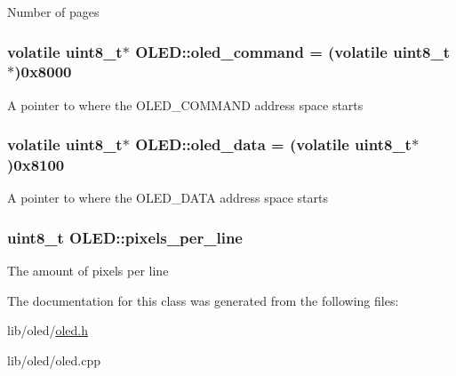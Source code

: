 Number of pages \hypertarget{class_o_l_e_d_af0a85ccd0274347b8c1ac77d298a14cf}{
\subsubsection[{oled\-\_\-command}]{\setlength{\rightskip}{0pt plus 5cm}volatile uint8\-\_\-t$\ast$ O\-L\-E\-D\-::oled\-\_\-command = (volatile uint8\-\_\-t$\ast$)0x8000\hspace{0.3cm}{\ttfamily [protected]}}}\label{class_o_l_e_d_af0a85ccd0274347b8c1ac77d298a14cf}
A pointer to where the O\-L\-E\-D\-\_\-\-C\-O\-M\-M\-A\-N\-D address space starts \hypertarget{class_o_l_e_d_a1bc54d49808f92ddfc354511b692df6f}{
\subsubsection[{oled\-\_\-data}]{\setlength{\rightskip}{0pt plus 5cm}volatile uint8\-\_\-t$\ast$ O\-L\-E\-D\-::oled\-\_\-data = (volatile uint8\-\_\-t$\ast$)0x8100\hspace{0.3cm}{\ttfamily [protected]}}}\label{class_o_l_e_d_a1bc54d49808f92ddfc354511b692df6f}
A pointer to where the O\-L\-E\-D\-\_\-\-D\-A\-T\-A address space starts \hypertarget{class_o_l_e_d_a6ddac7b826eccac8c682c5246ef52b29}{
\subsubsection[{pixels\-\_\-per\-\_\-line}]{\setlength{\rightskip}{0pt plus 5cm}uint8\-\_\-t O\-L\-E\-D\-::pixels\-\_\-per\-\_\-line\hspace{0.3cm}{\ttfamily [protected]}}}\label{class_o_l_e_d_a6ddac7b826eccac8c682c5246ef52b29}
The amount of pixels per line 

The documentation for this class was generated from the following files\-:\begin{DoxyCompactItemize}
\item 
lib/oled/\hyperlink{oled_8h}{oled.\-h}\item 
lib/oled/oled.\-cpp\end{DoxyCompactItemize}
